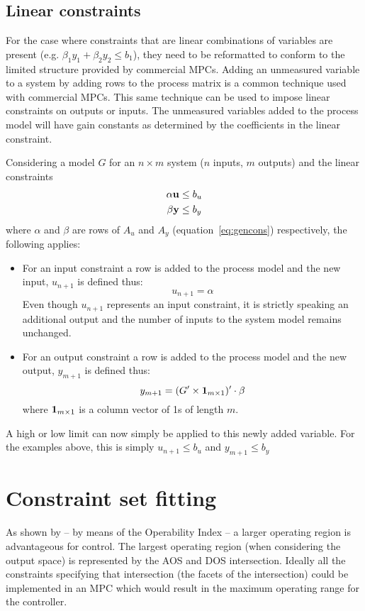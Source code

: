\subsection{Linear constraints}\label{sec:lincons}
For the case where constraints that are linear combinations of variables are present (e.g. $\beta_1 y_1+\beta_2 y_2\leq b_1$), they need to be reformatted to conform to the limited structure provided by commercial MPCs.
Adding an unmeasured variable to a system by adding rows to the process matrix is a common technique used with commercial MPCs.
This same technique can be used to impose linear constraints  on outputs or inputs.
The unmeasured variables added to the process model will have gain constants as determined by the coefficients in the linear constraint.

Considering a model $G$ for an $n\times m$ system ($n$ inputs, $m$ outputs) and the linear constraints 
\begin{align}
  \alpha {\bf {u}} &\leq b_u\notag\\ 
  \beta {\bf {y}} &\leq b_y \notag   
\end{align}
where $\alpha$ and $\beta$ are rows of $A_u$ and $A_y$ (equation~\ref{eq:gencons}) respectively, the following applies:
\begin{itemize}
\item For an input constraint a row is added to the process model and the new input, $u_{n+1}$ is defined thus:
\begin{equation}
  \label{eq:linconinput}
   u_{n+1} = \alpha
\end{equation}
Even though $u_{n+1}$ represents an input constraint, it is strictly speaking an additional output and the number of inputs to the system model remains unchanged. 
\item For an output constraint a row is added to the process model and the new output, $y_{m+1}$ is defined thus:
\begin{equation}
  \label{eq:linconoutput}
   y_{m+1} = (G'\times{\bf {1}}_{m\times 1})'\cdot\beta
\end{equation}
where ${\bf {1}}_{m\times 1}$ is a column vector of 1s of length $m$.
\end{itemize}
A high or low limit can now simply be applied to this newly added variable.
For the examples above, this is simply $u_{n+1}\leq b_u$ and $y_{m+1}\leq b_y$


\section{Constraint set fitting}
As shown by \citet{vinsonphd} -- by means of the Operability Index -- a larger operating region is advantageous for control.
The largest operating region (when considering the output space) is represented by the AOS and DOS intersection.
Ideally all the constraints specifying that intersection (the facets of the intersection) could be implemented in an MPC which would result in the maximum operating range for the controller.

